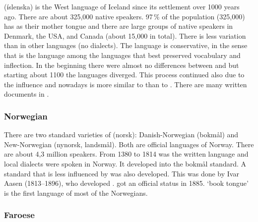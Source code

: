  (íslenska) is the West  language of Iceland since its settlement over 1000 years ago. 
There are about 325,000 native speakers. 97\,\% of the  population (325,000) has  as their
mother tongue and there are large groups of native speakers in Denmark, the USA, and Canada
(about 15,000 in total). 
There is less variation than in other  languages (no dialects). 
The language is conservative, in the sense that 
is the language among the  languages that best preserved  vocabulary and inflection.
In the beginning there were almost no differences between  and  but
starting about 1100 the languages diverged. This process continued also due to the 
influence and nowadays  is more similar to  than to . There are many written documents in .

\subsubsection{Norwegian}

\largerpage
There are two standard varieties of  (norsk): Danish-Norwegian (bokmål) and New-Norwegian (nynorsk, landsmål). 
Both are official languages of Norway.
There are about 4,3 million speakers.
From 1380 to 1814  was the written language and local dialects were spoken in Norway. It developed into the bokmål standard.
A standard that is less influenced by  was also developed. This was done by Ivar Aasen (1813--1896), 
who developed .  got an official status in 1885.  `book tongue' is the first language of most
of the Norwegians.

\subsubsection{Faroese}

